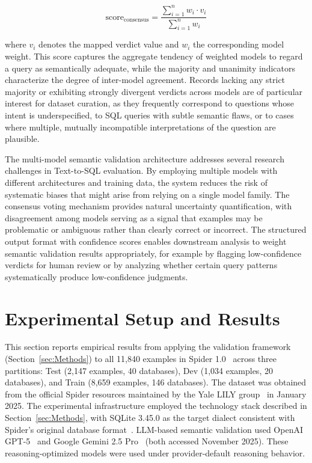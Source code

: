 \documentclass[]{einformatica}
\begin{document}
\begin{equation}
\text{score}_{\text{consensus}} = \frac{\sum_{i=1}^{n} w_i \cdot v_i}{\sum_{i=1}^{n} w_i}
\end{equation}

where $v_i$ denotes the mapped verdict value and $w_i$ the corresponding model weight. This score captures the aggregate tendency of weighted models to regard a query as semantically adequate, while the majority and unanimity indicators characterize the degree of inter-model agreement. Records lacking any strict majority or exhibiting strongly divergent verdicts across models are of particular interest for dataset curation, as they frequently correspond to questions whose intent is underspecified, to SQL queries with subtle semantic flaws, or to cases where multiple, mutually incompatible interpretations of the question are plausible.

The multi-model semantic validation architecture addresses several research challenges in Text-to-SQL evaluation. By employing multiple models with different architectures and training data, the system reduces the risk of systematic biases that might arise from relying on a single model family. The consensus voting mechanism provides natural uncertainty quantification, with disagreement among models serving as a signal that examples may be problematic or ambiguous rather than clearly correct or incorrect. The structured output format with confidence scores enables downstream analysis to weight semantic validation results appropriately, for example by flagging low-confidence verdicts for human review or by analyzing whether certain query patterns systematically produce low-confidence judgments.

\section{Experimental Setup and Results}\label{sec:Results}

This section reports empirical results from applying the validation framework (Section~\ref{sec:Methods}) to all 11,840 examples in Spider 1.0~\cite{yu2018spider} across three partitions: Test (2,147 examples, 40 databases), Dev (1,034 examples, 20 databases), and Train (8,659 examples, 146 databases). The dataset was obtained from the official Spider resources maintained by the Yale LILY group~\cite{spiderLeaderboard} in January 2025. The experimental infrastructure employed the technology stack described in Section~\ref{sec:Methods}, with SQLite 3.45.0 as the target dialect consistent with Spider's original database format~\cite{yu2018spider,sqliteForeignKeys}. LLM-based semantic validation used OpenAI GPT-5~\cite{openaiModelsDocs} and Google Gemini 2.5 Pro~\cite{geminiApiDocs} (both accessed November 2025). These reasoning-optimized models were used under provider-default reasoning behavior.
\end{document}
